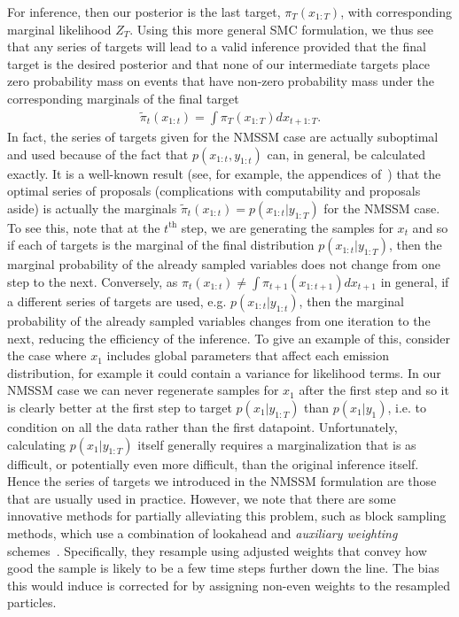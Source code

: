 For inference, then our posterior is the
last target, $\pi_T (x_{1:T})$, with corresponding marginal likelihood $Z_T$.  Using this
more general SMC formulation, we thus see that any series of targets will lead
to a valid inference provided that the final target is the desired posterior and that none
of our intermediate targets place zero probability mass on events that have non-zero
probability mass under the corresponding marginals of the final target 
\begin{align}
\label{eq:part:opt-target}
\tilde{\pi}_t (x_{1:t}) = \int \pi_T (x_{1:T}) dx_{t+1:T}.
\end{align}
In fact, the series of targets given
for the NMSSM case are actually suboptimal and used because of the fact that
$p(x_{1:t},y_{1:t})$ can, in general, be calculated exactly.  It is a well-known result
(see, for example, the appendices of~\cite{le2017auto}) that the optimal series
of proposals (complications with computability and proposals aside) is actually 
the marginals $\tilde{\pi}_t (x_{1:t})=p(x_{1:t} | y_{1:T})$ for
the NMSSM case.  To see this, note that at the $t^{\mathrm{th}}$ step, we are generating 
the samples for $x_{t}$ and so if each of targets is the marginal of the final distribution
$p(x_{1:t} | y_{1:T})$, then the marginal probability of the already sampled variables does not change from
one step to the next.  Conversely, as $\pi_t (x_{1:t}) \neq \int \pi_{t+1} (x_{1:t+1}) dx_{t+1}$
in general, if a different series of targets are used,
e.g. $p(x_{1:t}|y_{1:t})$, then the marginal probability of the already sampled
variables changes from one iteration to the next, reducing the efficiency of the inference.
To give an example of this, consider
the case where $x_{1}$ includes global parameters that affect each emission
distribution, for example it could contain a variance for
likelihood terms.  In our NMSSM case we can never regenerate samples for $x_1$ after
the first step and so it is clearly better at the first step to target $p(x_1 | y_{1:T})$ than $p(x_1|y_1)$,
i.e. to condition on all the data rather than the first datapoint. Unfortunately, calculating
$p(x_1 | y_{1:T})$ itself generally requires a marginalization that is as difficult, or potentially
even more difficult, than the original inference itself.  Hence the series of targets we introduced in
the NMSSM formulation are those that are usually used in practice.  However, we note that there are some
innovative methods for partially alleviating this problem, such as block sampling~\citep{doucet2006efficient} methods,
which use a combination of lookahead and \emph{auxiliary weighting} schemes~\citep{cappe2007overview}.
Specifically, they resample using adjusted weights that convey how good the sample is likely
to be a few time steps further down the line.  The bias this would induce is corrected for
by assigning non-even weights to the resampled particles.

